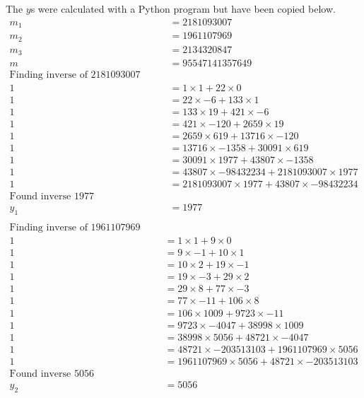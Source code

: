 \documentclass{article}
\begin{document}
The $y$s were calculated with a Python program but have been copied below.
\begin{align*}
    m_1 &= 2181093007 \\
    m_2 &= 1961107969 \\
    m_3 &= 2134320847 \\
    m &= 95547141357649 \\
    \text{Finding inverse of 2181093007 mod 43807} \\
    1 &= 1 \times 1 + 22 \times 0 \\
    1 &= 22 \times -6 + 133 \times 1 \\
    1 &= 133 \times 19 + 421 \times -6 \\
    1 &= 421 \times -120 + 2659 \times 19 \\
    1 &= 2659 \times 619 + 13716 \times -120 \\
    1 &= 13716 \times -1358 + 30091 \times 619 \\
    1 &= 30091 \times 1977 + 43807 \times -1358 \\
    1 &= 43807 \times -98432234 + 2181093007 \times 1977 \\
    1 &= 2181093007 \times 1977 + 43807 \times -98432234 \\
    \text{Found inverse 1977} \\
    y_1 &= 1977 \\
\end{align*}
\begin{align*}
    \text{Finding inverse of 1961107969 mod 48721} \\
    1 &= 1 \times 1 + 9 \times 0 \\
    1 &= 9 \times -1 + 10 \times 1 \\
    1 &= 10 \times 2 + 19 \times -1 \\
    1 &= 19 \times -3 + 29 \times 2 \\
    1 &= 29 \times 8 + 77 \times -3 \\
    1 &= 77 \times -11 + 106 \times 8 \\
    1 &= 106 \times 1009 + 9723 \times -11 \\
    1 &= 9723 \times -4047 + 38998 \times 1009 \\
    1 &= 38998 \times 5056 + 48721 \times -4047 \\
    1 &= 48721 \times -203513103 + 1961107969 \times 5056 \\
    1 &= 1961107969 \times 5056 + 48721 \times -203513103 \\
    \text{Found inverse 5056} \\
    y_2 &= 5056 \\
\end{align*}
\end{document}

